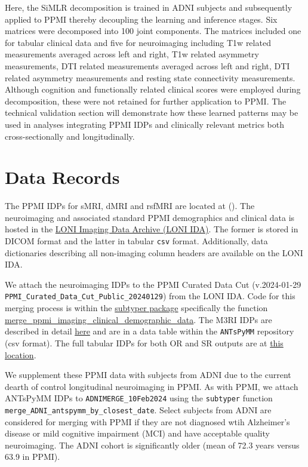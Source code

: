 \documentclass[
  table]{article}
\begin{document}
Here, the SiMLR decomposition is trained in ADNI subjects and
subsequently applied to PPMI thereby decoupling the learning and
inference stages. Six matrices were decomposed into 100 joint
components. The matrices included one for tabular clinical data and five
for neuroimaging including T1w related measurements averaged across left
and right, T1w related asymmetry measurements, DTI related measurements
averaged across left and right, DTI related asymmetry measurements and
resting state connectivity measurements. Although cognition and
functionally related clinical scores were employed during decomposition,
these were not retained for further application to PPMI. The technical
validation section will demonstrate how these learned patterns may be
used in analyses integrating PPMI IDPs and clinically relevant metrics
both cross-sectionally and longitudinally.

\section{Data Records}\label{data-records}

The PPMI IDPs for sMRI, dMRI and rsfMRI are located at
(). The neuroimaging and
associated standard PPMI demographics and clinical data is hosted in the
\href{http://ida.loni.usc.edu}{LONI Imaging Data Archive (LONI IDA)}.
The former is stored in DICOM format and the latter in tabular
\texttt{csv} format. Additionally, data dictionaries describing all
non-imaging column headers are available on the LONI IDA.

We attach the neuroimaging IDPs to the PPMI Curated Data Cut
(v.2024-01-29 \texttt{PPMI\_Curated\_Data\_Cut\_Public\_20240129}) from
the LONI IDA. Code for this merging process is within the
\href{https://stnava.github.io/subtyper/}{subtyper package} specifically
the function
\href{https://stnava.github.io/subtyper/reference/merge_ppmi_imaging_clinical_demographic_data.html}{merge\_ppmi\_imaging\_clinical\_demographic\_data}.
The M3RI IDPs are described in detail
\href{http://htmlpreview.github.io/?https://github.com/stnava/ANTsPyMM/blob/main/docs/make_dict_table.html}{here}
and are in a data table within the \texttt{ANTsPyMM} repository (csv
format). The full tabular IDPs for both OR and SR outputs are at
\href{https://figshare.com/articles/dataset/PPMI_MR_IDPs/25361071}{this
location}.

We supplement these PPMI data with subjects from ADNI due to the current
dearth of control longitudinal neuroimaging in PPMI. As with PPMI, we
attach ANTsPyMM IDPs to \texttt{ADNIMERGE\_10Feb2024} using the
\texttt{subtyper} function
\texttt{merge\_ADNI\_antspymm\_by\_closest\_date}. Select subjects from
ADNI are considered for merging with PPMI if they are not diagnosed wtih
Alzheimer's disease or mild cognitive impairment (MCI) and have
acceptable quality neuroimaging. The ADNI cohort is significantly older
(mean of 72.3 years versus 63.9 in PPMI).
\end{document}
